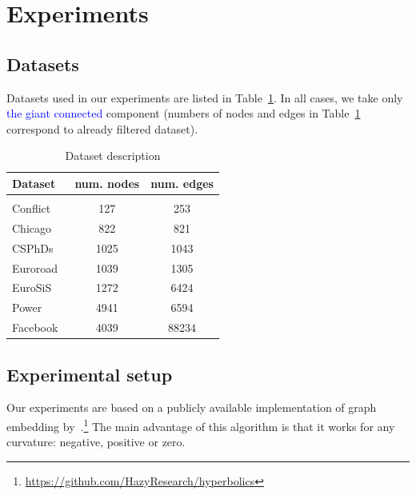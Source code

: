 \documentclass{article} %
\newcommand{\ph}[1]{\textcolor{blue}{#1}}
\begin{document}
\section{Experiments}

\subsection{Datasets}\label{sec:datasets}

Datasets used in our experiments are listed in Table~\ref{tab:datasets}. In all cases, we take only \ph{the giant connected} component (numbers of nodes and edges in Table~\ref{tab:datasets} correspond to already filtered dataset).

\begin{table}[t]
\caption{Dataset description}
\label{tab:datasets}
\begin{center}
\begin{tabular}{lcc}
Dataset & num. nodes & num. edges \\
 \hline \\
Conflict~\citep{ward2007disputes} & 127 & 253 \\
Chicago~\citep{eash1979equilibrium} & 822 & 821 \\
CSPhDs~\citep{nooy2006exploratory} & 1025 & 1043 \\
Euroroad~\citep{vsubelj2011robust} &  1039 & 1305 \\
EuroSiS~\citep{khokhar2015gephi} & 1272 & 6424 \\
Power~\citep{watts1998collective} & 4941 & 6594 \\
Facebook~\cite{leskovec2012learning} & 4039 & 88234 \\
\end{tabular}
\end{center}
\end{table}

\subsection{Experimental setup}\label{sec:setup}

Our experiments are based on a publicly available implementation of graph embedding by~\citet{gu2019learning}.\footnote{\url{https://github.com/HazyResearch/hyperbolics}} The main advantage of this algorithm is that it works for any curvature: negative, positive or zero. 
\end{document}
